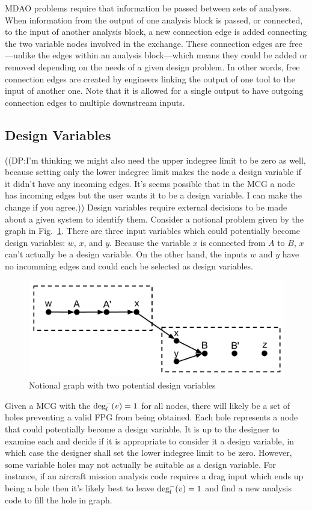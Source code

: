 	MDAO problems require that information be passed between sets of analyses. When 
	information from the output of one analysis block is passed, or connected, to the 
	input of another analysis block, a new connection edge is added connecting the two 
	variable nodes involved in the exchange. These connection edges are free---unlike the edges 
	within an analysis block---which means they could be added or removed depending on the needs
	of a given design problem. In other words, free connection edges are created by 
	engineers linking the output of one tool to the input of another one. Note that 
	it is allowed for a single output to have outgoing connection edges to multiple 
	downstream inputs. 

\subsection{Design Variables}
	\label{ss:design variables}
	((DP:I'm thinking we might also need the upper indegree limit to be zero as well, because setting only the lower indegree limit makes the node a design variable if it didn't have any incoming edges. It's seems possible that in the MCG a node has incoming edges but the user wants it to be a design variable. I can make the change if you agree.))
	Design variables require external decisions 
	to be made about a given system to identify them. Consider 
	a notional problem given by the graph in Fig.~\ref{f:designvars}. There are three input variables 
	which could potentially become design variables: $w$, $x$, and $y$. Because the variable $x$ is connected from $A$ to $B$,
	 $x$ can't actually be a design variable. On the other hand, the inputs $w$ and $y$
	have no incomming edges and could each be selected as design variables. 
	\begin{figure}[htb!]
	  \begin{center}
		\includegraphics[width=.6\textwidth]{images/design_vars_graph}
	  \end{center}
	  \caption{Notional graph with two potential design variables \label{f:designvars}}
	\end{figure}

	Given a MCG with the $\textrm{deg}_l^-(v)=1$ for all nodes, there will likely be a set of holes preventing a valid FPG from being obtained.
	Each hole represents a node that could potentially become a design variable. 
	It is up to the designer to examine each and decide if it is appropriate to 
	consider it a design variable, in which case the designer shall set the lower indegree limit to be zero. However, some variable holes may not actually be suitable as a design variable. For instance, if an aircraft mission analysis code requires a drag input 
	which ends up being a hole then it's likely best to leave
	$\textrm{deg}_l^-(v)=1$ and find a new analysis code to fill the hole in graph. 

